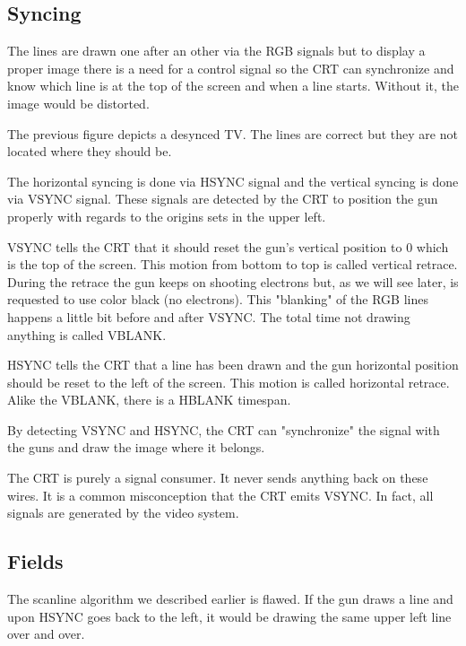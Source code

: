 \subsection{Syncing}
The lines are drawn one after an other via the RGB signals but to display a proper image there is a need for a control signal so the CRT can synchronize and know which line is at the top of the screen and when a line starts. Without it, the image would be distorted. 



The previous figure depicts a desynced TV. The lines are correct but they are not located where they should be.

The horizontal syncing is done via HSYNC signal and the vertical syncing is done via VSYNC signal. These signals are detected by the CRT to position the gun properly with regards to the origins sets in the upper left.

VSYNC tells the CRT that it should reset the gun's vertical position to 0 which is the top of the screen. This motion from bottom to top is called vertical retrace. During the retrace the gun keeps on shooting electrons but, as we will see later, is requested to use color black (no electrons). This "blanking" of the RGB lines happens a little bit before and after VSYNC. The total time not drawing anything is called VBLANK.

HSYNC tells the CRT that a line has been drawn and the gun horizontal position should be reset to the left of the screen. This motion is called horizontal retrace. Alike the VBLANK, there is a HBLANK timespan.

By detecting VSYNC and HSYNC, the CRT can "synchronize" the signal with the guns and draw the image where it belongs.


\begin{trivia} The CRT is purely a signal consumer. It never sends anything back on these wires. It is a common misconception that the CRT emits VSYNC. In fact, all signals are generated by the video system.
\end{trivia}


\subsection{Fields}

The scanline algorithm we described earlier is flawed. If the gun draws a line and upon HSYNC goes back to the left, it would be drawing the same upper left line over and over. 

